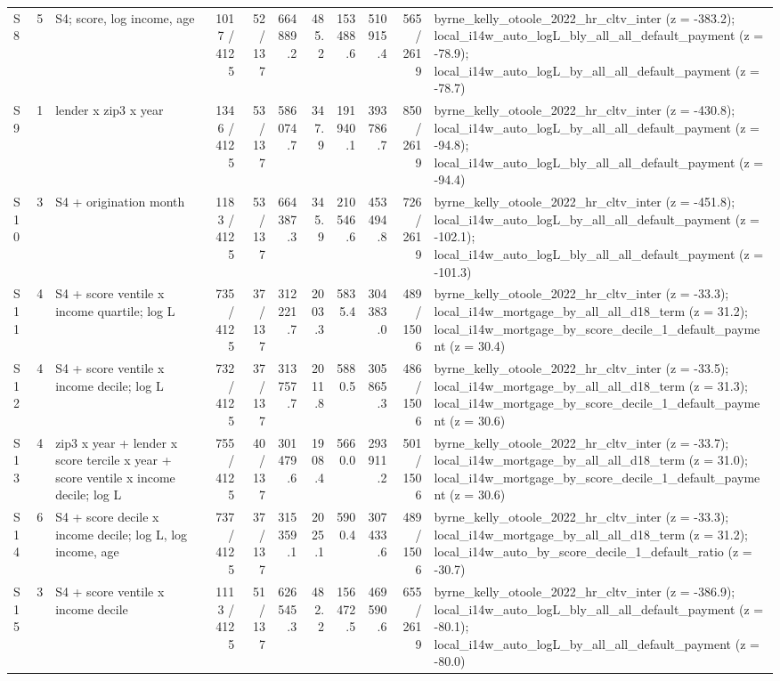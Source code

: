 \begin{tabular}{llp{4.2cm}rrrrrrrp{4.6cm}}
S8 & 5 & S4; score, log income, age & 1017 / 4125 & 52 / 137 & 664889.2 & 485.2 & 153488.6 & 510915.4 & 565 / 2619 & byrne\_kelly\_otoole\_2022\_hr\_cltv\_inter (z = -383.2); local\_i14w\_auto\_logL\_bly\_all\_all\_default\_payment (z = -78.9); local\_i14w\_auto\_logL\_by\_all\_all\_default\_payment (z = -78.7) \\
S9 & 1 & lender x zip3 x year & 1346 / 4125 & 53 / 137 & 586074.7 & 347.9 & 191940.1 & 393786.7 & 850 / 2619 & byrne\_kelly\_otoole\_2022\_hr\_cltv\_inter (z = -430.8); local\_i14w\_auto\_logL\_by\_all\_all\_default\_payment (z = -94.8); local\_i14w\_auto\_logL\_bly\_all\_all\_default\_payment (z = -94.4) \\
S10 & 3 & S4 + origination month & 1183 / 4125 & 53 / 137 & 664387.3 & 345.9 & 210546.6 & 453494.8 & 726 / 2619 & byrne\_kelly\_otoole\_2022\_hr\_cltv\_inter (z = -451.8); local\_i14w\_auto\_logL\_by\_all\_all\_default\_payment (z = -102.1); local\_i14w\_auto\_logL\_bly\_all\_all\_default\_payment (z = -101.3) \\
S11 & 4 & S4 + score ventile x income quartile; log L & 735 / 4125 & 37 / 137 & 312221.7 & 2003.3 & 5835.4 & 304383.0 & 489 / 1506 & byrne\_kelly\_otoole\_2022\_hr\_cltv\_inter (z = -33.3); local\_i14w\_mortgage\_by\_all\_all\_d18\_term (z = 31.2); local\_i14w\_mortgage\_by\_score\_decile\_1\_default\_payment (z = 30.4) \\
S12 & 4 & S4 + score ventile x income decile; log L & 732 / 4125 & 37 / 137 & 313757.7 & 2011.8 & 5880.5 & 305865.3 & 486 / 1506 & byrne\_kelly\_otoole\_2022\_hr\_cltv\_inter (z = -33.5); local\_i14w\_mortgage\_by\_all\_all\_d18\_term (z = 31.3); local\_i14w\_mortgage\_by\_score\_decile\_1\_default\_payment (z = 30.6) \\
S13 & 4 & zip3 x year + lender x score tercile x year + score ventile x income decile; log L & 755 / 4125 & 40 / 137 & 301479.6 & 1908.4 & 5660.0 & 293911.2 & 501 / 1506 & byrne\_kelly\_otoole\_2022\_hr\_cltv\_inter (z = -33.7); local\_i14w\_mortgage\_by\_all\_all\_d18\_term (z = 31.0); local\_i14w\_mortgage\_by\_score\_decile\_1\_default\_payment (z = 30.6) \\
S14 & 6 & S4 + score decile x income decile; log L, log income, age & 737 / 4125 & 37 / 137 & 315359.1 & 2025.1 & 5900.4 & 307433.6 & 489 / 1506 & byrne\_kelly\_otoole\_2022\_hr\_cltv\_inter (z = -33.3); local\_i14w\_mortgage\_by\_all\_all\_d18\_term (z = 31.2); local\_i14w\_auto\_by\_score\_decile\_1\_default\_ratio (z = -30.7) \\
S15 & 3 & S4 + score ventile x income decile & 1113 / 4125 & 51 / 137 & 626545.3 & 482.2 & 156472.5 & 469590.6 & 655 / 2619 & byrne\_kelly\_otoole\_2022\_hr\_cltv\_inter (z = -386.9); local\_i14w\_auto\_logL\_bly\_all\_all\_default\_payment (z = -80.1); local\_i14w\_auto\_logL\_by\_all\_all\_default\_payment (z = -80.0) \\

\end{tabular}
